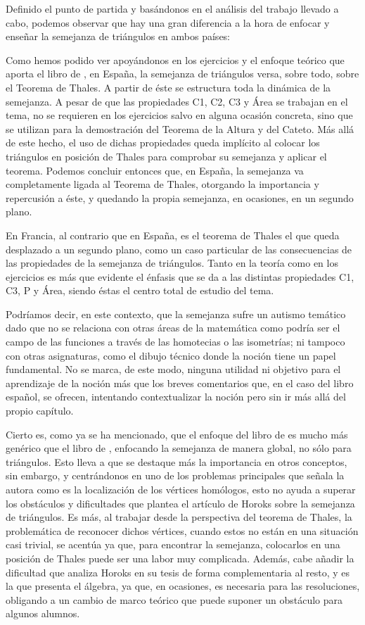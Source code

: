 	Definido el punto de partida y basándonos en el análisis del trabajo llevado a cabo, podemos observar que hay una gran diferencia a la hora de enfocar y enseñar la semejanza de triángulos en ambos países:
	
	Como hemos podido ver apoyándonos en los ejercicios y el enfoque teórico que aporta el libro de \citet{spa}, en España, la semejanza de triángulos versa, sobre todo, sobre el Teorema de Thales. A partir de éste se estructura toda la dinámica de la semejanza. A pesar de que las propiedades C1, C2, C3 y Área se trabajan en el tema, no se requieren en los ejercicios salvo en alguna ocasión concreta, sino que se utilizan para la demostración del Teorema de la Altura y del Cateto. Más allá de este hecho, el uso de dichas propiedades queda implícito al colocar los triángulos en posición de Thales para comprobar su semejanza y aplicar el teorema. Podemos concluir entonces que, en España, la semejanza va completamente ligada al Teorema de Thales, otorgando la importancia y repercusión a éste, y quedando la propia semejanza, en ocasiones, en un segundo plano. 
	
	En Francia, al contrario que en España, es el teorema de Thales el que queda desplazado a un segundo plano, como un caso particular de las consecuencias de las propiedades de la semejanza de triángulos. Tanto en la teoría como en los ejercicios es más que evidente el énfasis que se da a las distintas propiedades C1, C3, P y Área, siendo éstas el centro total de estudio del tema.
	
	Podríamos decir, en este contexto, que la semejanza sufre un autismo temático dado que no se relaciona con otras áreas de la matemática como podría ser el campo de las funciones a través de las homotecias o las isometrías; ni tampoco con otras asignaturas, como el dibujo técnico donde la noción tiene un papel fundamental. No se marca, de este modo, ninguna utilidad ni objetivo para el aprendizaje de la noción más que los breves comentarios que, en el caso del libro español, se ofrecen, intentando contextualizar la noción pero sin ir más allá del propio capítulo.
	
	Cierto es, como ya se ha mencionado, que el enfoque del libro de \citet{spa} es mucho más genérico que el libro de \citet{fr}, enfocando la semejanza de manera global, no sólo para triángulos. Esto lleva a que se destaque más la importancia en otros conceptos, sin embargo, y centrándonos en uno de los problemas principales que señala la autora como es la localización de los vértices homólogos, esto no ayuda a superar los obstáculos y dificultades que plantea el artículo de Horoks sobre la semejanza de triángulos. Es más, al trabajar desde la perspectiva del teorema de Thales, la problemática de reconocer dichos vértices, cuando estos no están en una situación casi trivial, se acentúa ya que, para encontrar la semejanza, colocarlos en una posición de Thales puede ser una labor muy complicada. Además, cabe añadir la dificultad que analiza Horoks en su tesis de forma complementaria al resto, y es la que presenta el álgebra, ya que, en ocasiones, es necesaria para las resoluciones, obligando a un cambio de marco teórico que puede suponer un obstáculo para algunos alumnos.
	

